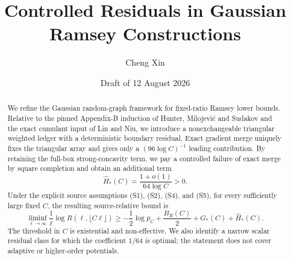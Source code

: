 \documentclass[11pt,reqno]{amsart}
\title[Controlled residuals]{Controlled Residuals in Gaussian Ramsey Constructions}
\author{Cheng Xin}
\date{Draft of 12 August 2026}
\theoremstyle{definition}
\theoremstyle{remark}
\begin{document}
\begin{abstract}
We refine the Gaussian random-graph framework for fixed-ratio Ramsey lower
bounds.  Relative to the pinned Appendix-B induction of Hunter, Milojevi\'c
and Sudakov and the exact cumulant input of Lin and Niu, we introduce a
nonexchangeable triangular weighted ledger with a deterministic boundary
residual.  Exact gradient merge uniquely fixes the triangular array and gives
only a \((96\log C)^{-1}\) leading contribution.  By retaining the full-box
strong-concavity term, we pay a controlled failure of exact merge by square
completion and obtain an additional term
\[
 \widehat H_*(C)=\frac{1+o(1)}{64\log C}>0.
\]
Under the explicit source assumptions (S1), (S2), (S4), and (S5), for every
sufficiently large fixed \(C\), the resulting source-relative bound is
\[
 \liminf_{\ell\to\infty}\frac1\ell
 \log R(\ell,\lfloor C\ell\rfloor)
 \ge -\frac12\log p_C+\frac{B_R(C)}2+G_*(C)+\widehat H_*(C).
\]
The threshold in \(C\) is existential and non-effective.  We also identify a
narrow scalar residual class for which the coefficient \(1/64\) is optimal;
the statement does not cover adaptive or higher-order potentials.
\end{abstract}

\maketitle
\tableofcontents










\appendix





\end{document}
